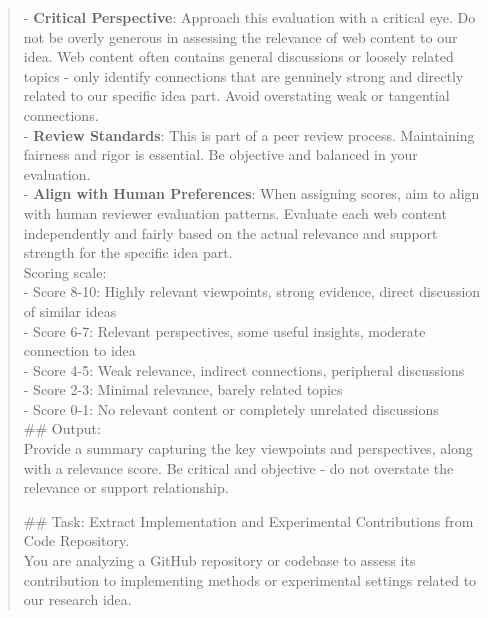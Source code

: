 \begin{quote}
\begin{tcolorbox}[breakable,colback=grounding!20!white, colframe=grounding!60!black, title=\textbf{Prompt for Grounding Agent - Web}]
        - \textbf{Critical Perspective}: Approach this evaluation with a critical eye. Do not be overly generous in assessing the relevance of web content to our idea. Web content often contains general discussions or loosely related topics - only identify connections that are genuinely strong and directly related to our specific idea part. Avoid overstating weak or tangential connections.\\
   
        - \textbf{Review Standards}: This is part of a peer review process. Maintaining fairness and rigor is essential. Be objective and balanced in your evaluation.\\
   
        - \textbf{Align with Human Preferences}: When assigning scores, aim to align with human reviewer evaluation patterns. Evaluate each web content independently and fairly based on the actual relevance and support strength for the specific idea part.\\
   
        Scoring scale:\\
        - Score 8-10: Highly relevant viewpoints, strong evidence, direct discussion of similar ideas\\
        - Score 6-7: Relevant perspectives, some useful insights, moderate connection to idea\\
        - Score 4-5: Weak relevance, indirect connections, peripheral discussions\\
        - Score 2-3: Minimal relevance, barely related topics\\
        - Score 0-1: No relevant content or completely unrelated discussions\\

        \#\# Output:\\
        Provide a summary capturing the key viewpoints and perspectives, along with a relevance score. Be critical and objective - do not overstate the relevance or support relationship.
    \end{tcolorbox}

    \begin{tcolorbox}[breakable,colback=grounding!20!white, colframe=grounding!60!black, title=\textbf{Prompt for Grounding Agent - Code}]
    \label{app:prompt_grounding_code}
        \#\# Task: Extract Implementation and Experimental Contributions from Code Repository.\\

        You are analyzing a GitHub repository or codebase to assess its contribution to implementing methods or experimental settings related to our research idea.\\


\end{tcolorbox}
\end{quote}

